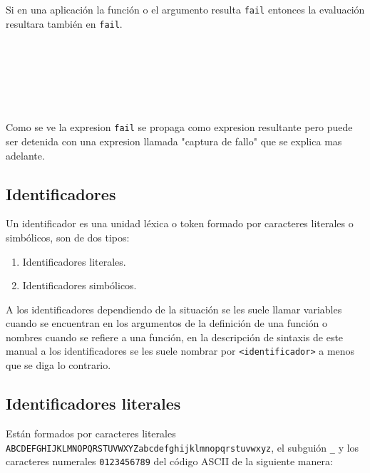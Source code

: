       \begin{fxcode}
      \end{fxcode}
      
      Si en una aplicación la función o el argumento resulta \texttt{fail} entonces la evaluación resultara también en \texttt{fail}.
      
      \begin{fxcode}
         \\
         \\
         \\
         \\
         \\
      \end{fxcode}
      
      Como se ve la expresion \texttt{fail} se propaga como expresion resultante pero puede ser detenida con una expresion llamada "captura de fallo" que se explica mas adelante.
      
      \subsection{Identificadores}
      Un identificador es una unidad léxica o token formado por caracteres literales o simbólicos, son de dos tipos:
      
      \begin{enumerate}
         \item Identificadores literales.
         \item Identificadores simbólicos.
      \end{enumerate}
      
      A los identificadores dependiendo de la situación se les suele llamar variables cuando se encuentran en los argumentos de la definición de una función o nombres cuando se refiere a una función, en la descripción de sintaxis de este manual a los identificadores se les suele nombrar por \texttt {<identificador>} a menos que se diga lo contrario.
      
      \subsection{Identificadores literales}
      Están formados por caracteres literales \texttt{ABCDEFGHIJKLMNOPQRSTUVWXYZabcdefghijklmnopqrstuvwxyz}, el subguión \texttt{\_} y los caracteres numerales \texttt{0123456789} del código ASCII de la siguiente manera:
      
